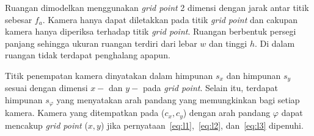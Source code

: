 Ruangan dimodelkan menggunakan \textit{grid point} 2 dimensi dengan jarak antar titik sebesar \(f_a\). Kamera hanya dapat diletakkan pada titik \textit{grid point} dan cakupan kamera hanya diperiksa terhadap titik \textit{grid point}. Ruangan berbentuk persegi panjang sehingga ukuran ruangan terdiri dari lebar \(w\) dan tinggi \(h\). Di dalam ruangan tidak terdapat penghalang apapun.

Titik penempatan kamera dinyatakan dalam himpunan \(s_x\) dan himpunan \(s_y\) sesuai dengan dimensi \(x-\) dan \(y-\) pada \textit{grid point}. Selain itu, terdapat himpunan \(s_\varphi\) yang menyatakan arah pandang yang memungkinkan bagi setiap kamera. Kamera yang ditempatkan pada (\(c_x,c_y\)) dengan arah pandang \(\varphi\) dapat mencakup \textit{grid point} (\(x,y\)) jika pernyataan~\ref{eq:l1},~\ref{eq:l2}, dan~\ref{eq:l3} dipenuhi.

